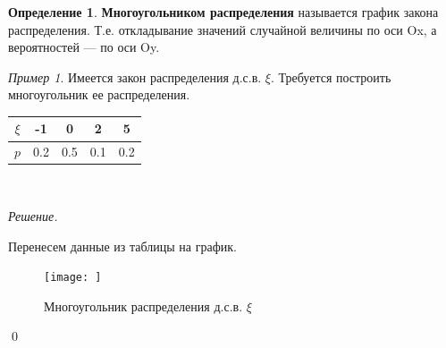 \documentclass[12pt,a4paper]{article}
\theoremstyle{definition}
\newtheorem{definition}{Определение}[section]
\theoremstyle{definition}
\theoremstyle{remark}
\theoremstyle{corollary}
\newcommand{\nextblock}{\vspace{1.5em}\noindent}
\theoremstyle{bolditalic}
\newtheorem{example}{Пример}[section]
\newenvironment{solution}{
    \vspace{0.5em}
    \noindent\textit{Решение.}
}{\qed\vspace{1em}}
\begin{document}
\begin{definition}
    \textbf{Многоугольником распределения} называется график закона распределения. Т.е. откладывание значений случайной величины по оси Ox, а вероятностей --- по оси Oy.
\end{definition}

\begin{example}
    Имеется закон распределения д.с.в. $\xi$. Требуется построить многоугольник ее распределения.\\
    
    \centering
    \begin{tabular}{|c|c|c|c|c|}
    \hline
    $\xi$ & -1 & 0 & 2 & 5 \\
    \hline
    $p$ & 0.2 & 0.5 & 0.1 & 0.2 \\
    \hline
    \end{tabular}\\
\end{example}

\nextblock

\begin{solution}
    Перенесем данные из таблицы на график.\\  
    
    \begin{figure}[h!]
    \centering
    \texttt{[image: ]}

    \caption{Многоугольник распределения д.с.в. $\xi$}
    \end{figure}
\end{solution}

\nextblock
\end{document}
